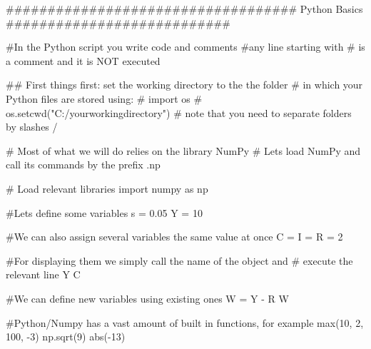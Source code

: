 \documentclass[
  letterpaper,
  DIV=11,
  numbers=noendperiod]{scrreprt}
\newenvironment{Shaded}{\begin{snugshade}}{\end{snugshade}}
\newcommand{\BuiltInTok}[1]{\textcolor[rgb]{0.00,0.23,0.31}{#1}}
\newcommand{\CommentTok}[1]{\textcolor[rgb]{0.37,0.37,0.37}{#1}}
\newcommand{\DecValTok}[1]{\textcolor[rgb]{0.68,0.00,0.00}{#1}}
\newcommand{\FloatTok}[1]{\textcolor[rgb]{0.68,0.00,0.00}{#1}}
\newcommand{\ImportTok}[1]{\textcolor[rgb]{0.00,0.46,0.62}{#1}}
\newcommand{\NormalTok}[1]{\textcolor[rgb]{0.00,0.23,0.31}{#1}}
\newcommand{\OperatorTok}[1]{\textcolor[rgb]{0.37,0.37,0.37}{#1}}
\begin{document}
\begin{tcolorbox}[enhanced jigsaw, titlerule=0mm, breakable, bottomrule=.15mm, toprule=.15mm, colbacktitle=quarto-callout-note-color!10!white, rightrule=.15mm, toptitle=1mm, opacityback=0, left=2mm, coltitle=black, title=\textcolor{quarto-callout-note-color}{\faInfo}\hspace{0.5em}{Python code}, colframe=quarto-callout-note-color-frame, opacitybacktitle=0.6, leftrule=.75mm, bottomtitle=1mm, arc=.35mm, colback=white]

\begin{Shaded}
\begin{Highlighting}[]

\CommentTok{\#\#\#\#\#\#\#\#\#\#\#\#\#\#\#\#\#\#\#\#\#\#\#\#\#\#\#\#\#\#\#\#\#\#\# Python Basics \#\#\#\#\#\#\#\#\#\#\#\#\#\#\#\#\#\#\#\#\#\#\#\#\#\#\#}

\CommentTok{\#In the Python script you write code and comments}
\CommentTok{\#any line starting with \# is a comment and it is NOT executed}

\CommentTok{\#\# First things first: set the working directory to the the folder }
\CommentTok{\# in which your Python files are stored using: }
\CommentTok{\# import os}
\CommentTok{\# os.setcwd("C:/yourworkingdirectory")}
\CommentTok{\# note that you need to separate folders by slashes /}

\CommentTok{\# Most of what we will do relies on the library NumPy}
\CommentTok{\# Let\textquotesingle{}s load NumPy and call its commands by the prefix .np}

\CommentTok{\# Load relevant libraries}
\ImportTok{import}\NormalTok{ numpy }\ImportTok{as}\NormalTok{ np }

\CommentTok{\#Let\textquotesingle{}s define some variables}
\NormalTok{s }\OperatorTok{=} \FloatTok{0.05}
\NormalTok{Y }\OperatorTok{=} \DecValTok{10}

\CommentTok{\#We can also assign several variables the same value at once}
\NormalTok{C }\OperatorTok{=}\NormalTok{ I }\OperatorTok{=}\NormalTok{ R }\OperatorTok{=} \DecValTok{2}

\CommentTok{\#For displaying them we simply call the name of the object and }
\CommentTok{\# execute the relevant line}
\NormalTok{Y}
\NormalTok{C}

\CommentTok{\#We can define new variables using existing ones}
\NormalTok{W }\OperatorTok{=}\NormalTok{ Y }\OperatorTok{{-}}\NormalTok{ R}
\NormalTok{W}

\CommentTok{\#Python/Numpy has a vast amount of built in functions, for example}
\BuiltInTok{max}\NormalTok{(}\DecValTok{10}\NormalTok{, }\DecValTok{2}\NormalTok{, }\DecValTok{100}\NormalTok{, }\OperatorTok{{-}}\DecValTok{3}\NormalTok{)}
\NormalTok{np.sqrt(}\DecValTok{9}\NormalTok{)}
\BuiltInTok{abs}\NormalTok{(}\OperatorTok{{-}}\DecValTok{13}\NormalTok{)}


\end{Highlighting}
\end{Shaded}
\end{tcolorbox}
\end{document}
